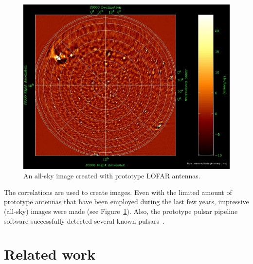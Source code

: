 \documentclass{sig-alternate}
\begin{document}
\begin{figure}[ht]
\includegraphics[width=\columnwidth]{all-sky-image.jpg}
\caption{An all-sky image created with prototype LOFAR antennas.}
\label{fig:all-sky-image}
\end{figure}

The correlations are used to create images.
Even with the limited amount of prototype antennas that have been employed
during the last few years, impressive (all-sky) images were made (see
Figure~\ref{fig:all-sky-image}).
Also, the prototype pulsar pipeline software successfully detected several
known pulsars~\cite{Hessels:09}.


\section{Related work}
\label{sec:related-work}


\end{document}
